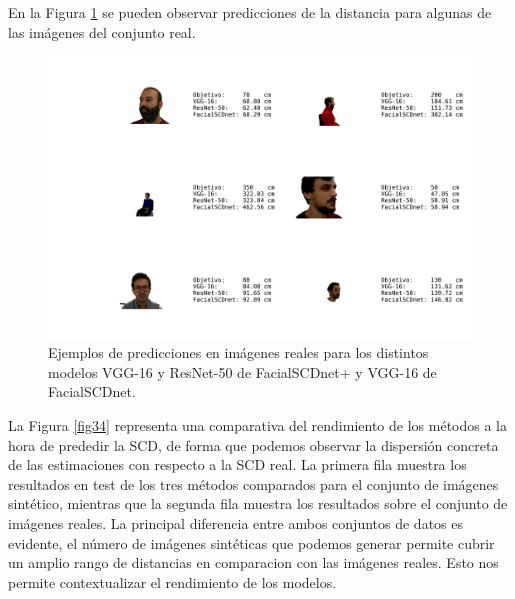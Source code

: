 En la Figura \ref{fig37} se pueden observar predicciones de la distancia para algunas de las imágenes del conjunto real.

\begin{figure}[h]
	\centering
	\includegraphics[width=\textwidth]{imagenes/cap5/predicts_real.png}
	\caption[Ejemplos de predicciones en imágenes reales.]{Ejemplos de predicciones en imágenes reales para los distintos modelos VGG-16 y ResNet-50 de FacialSCDnet+ y VGG-16 de FacialSCDnet.}
	\label{fig37}
\end{figure}

La Figura \ref{fig34} representa una comparativa del rendimiento de los métodos a la hora de prededir la SCD, de forma que podemos observar la dispersión concreta de las estimaciones con respecto a la SCD real. La primera fila muestra los resultados en test de los tres métodos comparados para el conjunto de imágenes sintético, mientras que la segunda fila muestra los resultados sobre el conjunto de imágenes reales. La principal diferencia entre ambos conjuntos de datos es evidente, el número de imágenes sintéticas que podemos generar permite cubrir un amplio rango de distancias en comparacion con las imágenes reales. Esto nos permite contextualizar el rendimiento de los modelos. 

